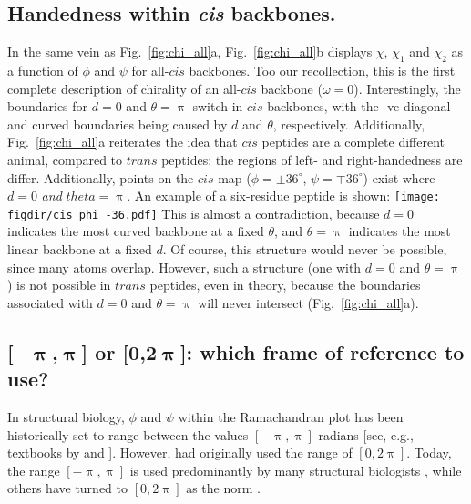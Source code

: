 \documentclass[fleqn,10pt]{wlpeerj} %
\newcommand{\Fig}[1]{Fig.~\ref{#1}}
\newcommand{\figdir}{./figures}
\begin{document}
\subsection*{Handedness within \textit{cis} backbones.}
In the same vein as \Fig{fig:chi_all}a, \Fig{fig:chi_all}b displays $\chi$, $\chi_1$ and $\chi_2$ as a function of $\phi$ and $\psi$ for all-$cis$ backbones. Too our recollection, this is the first complete description of chirality of an all-$cis$ backbone ($\omega=0$). Interestingly, the boundaries for $d=0$ and $\theta=\uppi$ switch in $cis$ backbones, with the -ve diagonal and curved boundaries being caused by $d$ and $\theta$, respectively. Additionally, \Fig{fig:chi_all}a reiterates the idea that $cis$ peptides are a complete different animal, compared to $trans$ peptides: the regions of left- and right-handedness are differ. Additionally, points on the $cis$ map ($\phi=\pm36^\circ$, $\psi=\mp36^\circ$) exist where $d=0$ {\em and} $theta=\uppi$. An example of a six-residue peptide is shown:\newline
\mbox{}\hfill\texttt{[image: \\figdir/cis\_phi\_-36.pdf]}\hfill\mbox{}\newline
This is almost a contradiction, because $d=0$ indicates the most curved backbone at a fixed $\theta$, and $\theta=\uppi$ indicates the most linear backbone at a fixed $d$. Of course, this structure would never be possible, since many atoms overlap. However, such a structure (one with $d=0$ and $\theta=\uppi$) is not possible in $trans$ peptides, even in theory, because the boundaries associated with $d=0$ and $\theta=\uppi$ will never intersect (\Fig{fig:chi_all}a). 

\subsection*{[$\bm{-\uppi}$,$\bm{\uppi}$] or [$\bm{0}$,$\bm{2\uppi}$]: which frame of reference to use?} 
In structural biology, $\phi$ and $\psi$ within the Ramachandran plot has been historically set to range between the values $[-\uppi,\uppi]$ radians [see, e.g., textbooks by \cite{Berg2006} and \cite{Alberts2002}]. However, \cite{Ramachandran1963} had originally used the range of $[0,2\uppi]$. Today, the range $[-\uppi,\uppi]$ is used predominantly by many structural biologists \citep{Laskowski1993,Laskowski2003,Zacharias2013}, while others have turned to $[0,2\uppi]$ as the norm \citep{Nemethy1966,Voelz2011}. 
\end{document}
